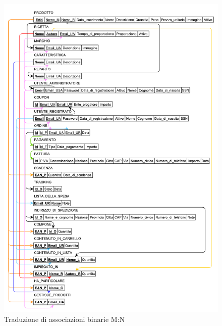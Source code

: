 	\begin{figure}[h]
		\centering
		\includegraphics[width=1\textwidth]
		{immagini/traduzione-associazioni-M-N}
		
		\caption{Traduzione di associazioni binarie M:N}
	\end{figure}